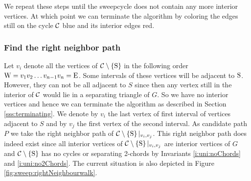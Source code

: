  We repeat these steps until the sweepcycle does not contain any more interior vertices. At which point we can terminate the algorithm by coloring the edges still on the cycle $\mathcal{C}$ blue and its interior edges red.

  \subsubsection{Find the right neighbor path}
    Let $v_i$ denote all the vertices of $\mathcal{C} \setminus \left\lbrace {\mathrm{S}} \right\rbrace$ in the following order $\mathrm{W} =  v_1   v_2   \ldots v_{n-1}   v_n = \mathrm{E}$.
    Some intervals of these vertices will be adjacent to $\mathrm{S}$. However, they can not be all adjacent to $S$ since then any vertex still in the interior of $\mathcal{C}$ would lie in a separating triangle of $G$. So we have no interior vertices and hence we can terminate the algorithm as described in Section \ref{sss:terminating}. We denote by $v_i$ the last vertex of first interval of vertices adjacent to $S$ and by $v_j$ the first vertex of the second interval.
    As candidate path $P$ we take the right neighbor path of $\mathcal{C} \setminus \left\lbrace {\mathrm{S}} \right\rbrace|_{v_i, v_j}$. This right neighbor path does indeed exist since all interior vertices of $\mathcal{C} \setminus \left\lbrace {\mathrm{S}} \right\rbrace|_{v_i, v_j}$ are interior vertices of $G$ and $\mathcal{C} \setminus \left\lbrace {\mathrm{S}} \right\rbrace$ has no cycles or separating 2-chords by Invariants \ref{i:uni:noChords} and \ref{i:uni:no2Chords}.
    The current situation is also depicted in Figure \ref{fig:sweep:rightNeighbourwalk}.

